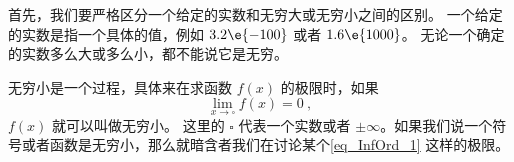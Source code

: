 

首先，我们要严格区分一个给定的实数和无穷大或无穷小之间的区别。 一个给定的实数是指一个具体的值，例如 $3.2\e{-100}$ 或者 $1.6\e{1000}$。 无论一个确定的实数多么大或多么小，都不能说它是无穷。

无穷小是一个过程，具体来在求函数 $f(x)$ 的极限时，如果
\begin{equation}\label{eq_InfOrd_1}
\lim_{x\to \square} f(x) = 0~,
\end{equation}
$f(x)$ 就可以叫做无穷小。 这里的 $\square$ 代表一个实数或者 $\pm\infty$。如果我们说一个符号或者函数是无穷小，那么就暗含者我们在讨论某个\autoref{eq_InfOrd_1} 这样的极限。

